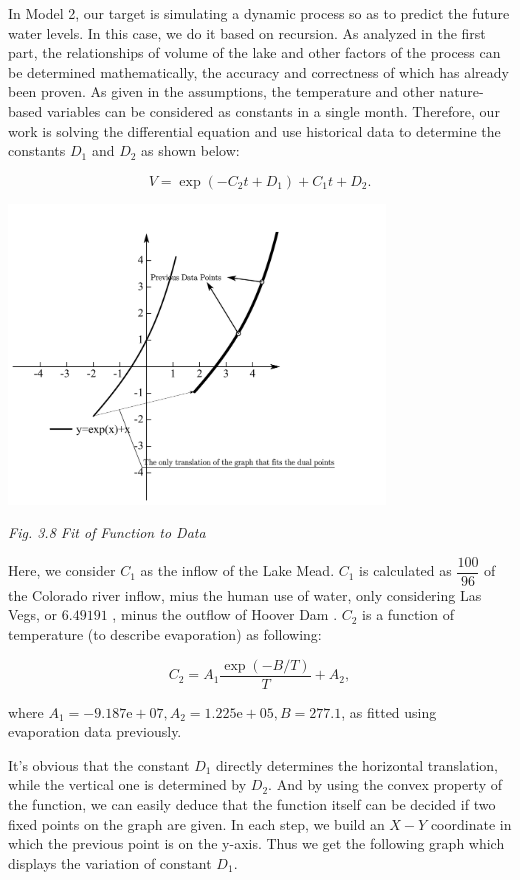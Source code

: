 \documentclass[12pt]{article}
\theoremstyle{definition}
\theoremstyle{remark}
\numberwithin{equation}{section}
\begin{document}
		In Model 2, our target is simulating a dynamic process so as to predict the future water levels. In this case, we do it based on recursion. As analyzed in the first part, the relationships of volume of the lake and other factors of the process can be determined mathematically, the accuracy and correctness of which has already been proven. As given in the assumptions, the temperature and other nature-based variables can be considered as constants in a single month. Therefore, our work is solving the differential equation and use historical data to determine the constants $D_1$ and $D_2$ as shown below:

		$$
		V=\exp (-C_2  t + D_1) + C_1 t + D_2.
		$$

		\begin{center}
		\includegraphics[width=10cm]{3.8 Fit of Function to Data.jpg}

		\small \textit{Fig. 3.8 Fit of Function to Data}
		\end{center}

		Here, we consider $C_1$ as the inflow of the Lake Mead. $C_1$ is calculated as $\dfrac{100}{96}$ of the Colorado river inflow, mius the human use of water, only considering Las Vegs, or $6.49191$ \cite{Water Use in Las Vegas}, minus the outflow of Hoover Dam \cite{Water Level Data}. $C_2$ is a function of temperature (to describe evaporation) as following:

		$$C_2 = A_1 \frac{\exp(-B / T)}{T} + A_2,$$

		where $A_1 = -9.187\mathrm{e}+07, A_2 = 1.225\mathrm{e}+05, B = 277.1$, as fitted using evaporation data previously.

		It's obvious that the constant $D_1$ directly determines the horizontal translation, while the vertical one is determined by $D_2$. And by using the convex property of the function, we can easily deduce that the function itself can be decided if two fixed points on the graph are given. In each step, we build an $X-Y$ coordinate in which the previous point is on the y-axis. Thus we get the following graph which displays the variation of constant $D_1$. 
\end{document}
